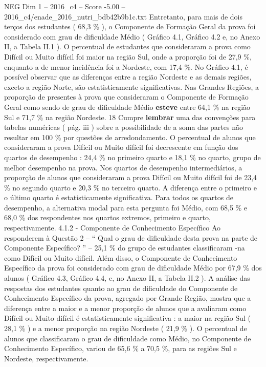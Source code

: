\begin{textsample}{NEG Dim 1 – 2016\_c4 – Score -5.00 – 2016\_c4/enade\_2016\_nutri\_bdb42b9b1c.txt}
Entretanto, para mais de dois terços dos estudantes ( 68,3 \% ), o Componente de Formação Geral da prova foi considerado com grau de dificuldade Médio ( Gráfico 4.1, Gráfico 4.2 e, no Anexo II, a Tabela II.1 ).
O percentual de estudantes que consideraram a prova como Difícil ou Muito difícil foi maior na região Sul, onde a proporção foi de 27,9 \%, enquanto a de menor incidência foi a Nordeste, com 17,4 \%.
No Gráfico 4.1, é possível observar que as diferenças entre a região Nordeste e as demais regiões, exceto a região Norte, são estatisticamente significativas.
Nas Grandes Regiões, a proporção de presentes à prova que consideraram o Componente de Formação Geral como sendo de grau de dificuldade Médio \textbf{esteve} entre 64,1 \% na região Sul e 71,7 \% na região Nordeste. 18 Cumpre \textbf{lembrar} uma das convenções para tabelas numéricas ( pág. iii ) sobre a possibilidade de a soma das partes não resultar em 100 \% por questões de arredondamento.
O percentual de alunos que consideraram a prova Difícil ou Muito difícil foi decrescente em função dos quartos de desempenho : 24,4 \% no primeiro quarto e 18,1 \% no quarto, grupo de melhor desempenho na prova.
Nos quartos de desempenho intermediários, a proporção de alunos que consideraram a prova Difícil ou Muito difícil foi de 23,4 \% no segundo quarto e 20,3 \% no terceiro quarto.
A diferença entre o primeiro e o último quarto é estatisticamente significativa.
Para todos os quartos de desempenho, a alternativa modal para esta pergunta foi Médio, com 68,5 \% e 68,0 \% dos respondentes nos quartos extremos, primeiro e quarto, respectivamente. 4.1.2 - Componente de Conhecimento Específico Ao responderem à Questão 2 – “ Qual o grau de dificuldade desta prova na parte de Componente Específico? ” – 25,1 \% do grupo de estudantes classificaram -na como Difícil ou Muito difícil.
Além disso, o Componente de Conhecimento Específico da prova foi considerado com grau de dificuldade Médio por 67,9 \% dos alunos ( Gráfico 4.3, Gráfico 4.4, e, no Anexo II, a Tabela II.2 ).
A análise das respostas dos estudantes quanto ao grau de dificuldade do Componente de Conhecimento Específico da prova, agregado por Grande Região, mostra que a diferença entre a maior e a menor proporção de alunos que a avaliaram como Difícil ou Muito difícil é estatisticamente significativa : a maior na região Sul ( 28,1 \% ) e a menor proporção na região Nordeste ( 21,9 \% ).
O percentual de alunos que classificaram o grau de dificuldade como Médio, no Componente de Conhecimento Específico, variou de 65,6 \% a 70,5 \%, para as regiões Sul e Nordeste, respectivamente.

\end{textsample}
